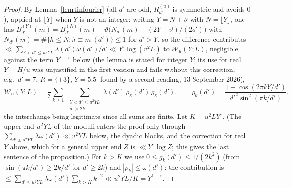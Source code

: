 \documentclass[11pt,a4paper]{article}
\theoremstyle{remark}\newtheorem{remark}[theorem]{Remark}
\begin{document}
\begin{proof}
By Lemma~\ref{lem:finfourier} (all $d'$ are odd, $R^{(u)}_{d'}$ is symmetric and avoids $0$), applied at $\lfloor Y\rfloor$
when $Y$ is not an integer: writing $Y=N+\vartheta$ with $N=\lfloor Y\rfloor$, one has
$B^{(Y)}_{d'}(m)=B^{(N)}_{d'}(m)+\vartheta\bigl(N_{d'}(m)-(2Y-\vartheta)/(2d')\bigr)$ with $N_{d'}(m)=\#\{h\le N:h\equiv m\ (d')\}\le1$
for $d'>Y$, so the difference contributes $\ll\sum_{Y<d'\le u^2YL}\lambda(d')\omega(d')/d'\ll Y^{\varepsilon}\log(u^2L)$ to
$\mathcal W_u(Y;L)$, negligible against the term $Y^{1-\varepsilon}$ below (the lemma is stated for integer $Y$; its use for
real $Y=H/u$ was unjustified in the first version and fails without this correction, e.g.\ $d'=7$, $R=\{\pm3\}$,
$Y=5.5$: found by a second reading, 13 September 2026),
\[
\mathcal W_u(Y;L)=\frac12\sum_{k\ge1}\ \sum_{\substack{Y<d'\le u^2YL\\ d'>2k}}\lambda(d')\,\rho_k(d')\,g_k(d'),\qquad
g_k(d')=\frac{1-\cos(2\pi kY/d')}{d'^2\sin^2(\pi k/d')},
\]
the interchange being legitimate since all sums are finite. Let $K=u^2LY^{\varepsilon}$. (The upper end $u^2YL$ of the moduli enters
the proof only through $\sum_{d'\le u^2YL}\lambda\omega(d')\ll u^2YL$ below, the dyadic blocks, and the correction for real $Y$ above,
which for a general upper end $Z$ is $\ll Y^{\varepsilon}\log Z$; this gives the last sentence of the proposition.) For $k>K$ we use
$0\le g_k(d')\le1/(2k^2)$ (from $\sin(\pi k/d')\ge2k/d'$ for $d'\ge2k$) and $|\rho_k|\le\omega(d')$: the contribution is
$\le\sum_{d'\le u^2YL}\lambda\omega(d')\sum_{k>K}k^{-2}\ll u^2YL/K=Y^{1-\varepsilon}$.


\end{proof}
\end{document}
